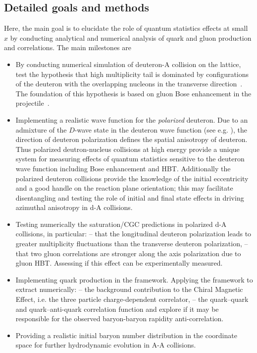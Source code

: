 	


    \vspace{0.5em}
    \subsection{Detailed goals and methods}
        \label{sec:p31}

		Here, the main goal is to elucidate the role of quantum statistics effects at small $x$ by 
		conducting analytical and numerical analysis of quark and gluon production and correlations. 
		The main milestones are 
		\begin{itemize}
			\item By conducting 
				numerical simulation of deuteron-A collision 
				on the lattice, test the hypothesis that high multiplicity tail is dominated by 
				configurations of the deuteron with the overlapping nucleons in the transverse direction~\cite{Kovner:2018azs,Mace:2018vwq}. 
				The foundation of this hypothesis is based on gluon Bose enhancement in the projectile~\cite{Mace:2018vwq}.   
			\item Implementing a realistic wave function for the {\it polarized} deuteron. 
				Due to an admixture of the 
				$D$-wave state in the deuteron wave function (see e.g. \myref\cite{Machleidt:2000ge}), 
				the direction of deuteron polarization defines the spatial
				anisotropy of deuteron. Thus polarized deutron-nucleus collisions 
				at high energy provide a unique system for measuring effects of quantum statistics sensitive to the 
				deuteron wave function including Bose enhancement and HBT. Additionally  the polarized deuteron collisions 
				provide the knowledge of the initial eccentricity and a good handle on the reaction plane orientation; 
				this may facilitate disentangling and testing the role of initial and final state effects in driving
				azimuthal anisotropy in d-A collisions.
			\item  Testing  numerically the saturation/CGC predictions in polarized d-A collisions, in particular: -- that  the longitudinal 
				deuteron polarization leads to greater multiplicity fluctuations than the transverse deuteron polarization,  --  that 
				two gluon correlations are stronger along the axis polarization due to gluon HBT. Assessing if this effect can be experimentally
				measured.
			\item Implementing quark production in the framework. Applying the framework to extract numerically: -- 
				the background contribution to the Chiral Magnetic Effect, i.e. the three particle charge-dependent correlator, -- 
				the quark--quark and quark--anti-quark correlation function and explore if it may be responsible for the 
				observed baryon-baryon rapidity anti-correlation. 
			\item Providing a realistic 
				initial baryon number  distribution in the coordinate space for further hydrodynamic evolution in A-A collisions. 
		\end{itemize}
		
